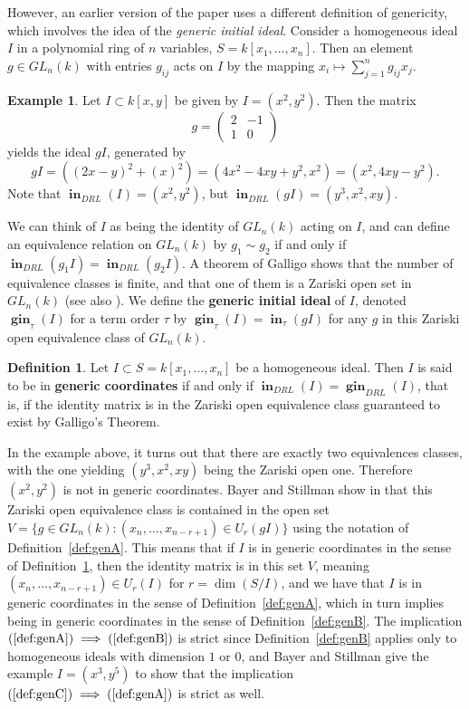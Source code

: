 \documentclass[11pt]{article}
\DeclareMathOperator{\Init}{\mathbf{in}}
\DeclareMathOperator{\gin}{\mathbf{gin}}
\theoremstyle{definition}
\newtheorem{definition}{Definition}
\newtheorem{example}{Example}
\begin{document}
However, an earlier version of the \cite{caminata2020solving} paper uses a different definition of genericity, which involves the idea of the \emph{generic initial ideal}. Consider a homogeneous ideal $I$ in a polynomial ring of $n$ variables, $S = k[x_1, \dots, x_n]$. Then an element $g \in GL_n(k)$ with entries $g_{ij}$ acts on $I$ by the mapping $x_i \mapsto \sum_{j = 1}^n g_{ij} x_j$. 

\begin{example}
	Let $I \subset k[x,y]$ be given by $I = (x^2, y^2)$. Then the matrix \[ g = \begin{pmatrix}
	2 & -1 \\
	1 & 0
\end{pmatrix} \] yields the ideal $gI$, generated by \[ gI = \left((2x - y)^2 + (x)^2\right) = (4x^2 - 4xy + y^2, x^2) = (x^2, 4xy - y^2). \] Note that $\Init_{DRL}(I) = (x^2, y^2)$, but $\Init_{DRL}(gI) = (y^3, x^2, xy)$. 
\end{example}

We can think of $I$ as being the identity of $GL_n(k)$ acting on $I$, and can define an equivalence relation on $GL_n(k)$ by $g_1 \sim g_2$ if and only if $\Init_{DRL}(g_1 I) = \Init_{DRL}(g_2 I)$. A theorem of Galligo \cite{galligo1974propos} shows that the number of equivalence classes is finite, and that one of them is a Zariski open set in $GL_n(k)$ (see also \cite{miller2005combinatorial}). We define the \textbf{generic initial ideal} of $I$, denoted $\gin_{\tau}(I)$ for a term order $\tau$ by $\gin_\tau(I) = \Init_\tau(gI)$ for any $g$ in this Zariski open equivalence class of $GL_n(k)$. 


\begin{definition}\label{def:genC}
	Let $I \subset S = k[x_1, \dots, x_n]$ be a homogeneous ideal. Then $I$ is said to be in \textbf{generic coordinates} if and only if $\Init_{DRL}(I) = \gin_{DRL}(I)$, that is, if the identity matrix is in the Zariski open equivalence class guaranteed to exist by Galligo's Theorem. 
\end{definition} 


In the example above, it turns out that there are exactly two equivalences classes, with the one yielding $(y^3, x^2, xy)$ being the Zariski open one. Therefore $(x^2,y^2)$ is not in generic coordinates. Bayer and Stillman show in \cite{bayer1987criterion} that this Zariski open equivalence class is contained in the open set $V = \{g \in GL_n(k) : (x_n, \dots, x_{n - r + 1}) \in U_r(gI)\}$ using the notation of Definition~\ref{def:genA}. This means that if $I$ is in generic coordinates in the sense of Definition~\ref{def:genC}, then the identity matrix is in this set $V$, meaning $(x_n, \dots, x_{n - r + 1}) \in U_r(I)$ for $r = \dim(S/I)$, and we have that $I$ is in generic coordinates in the sense of Definition~\ref{def:genA}, which in turn implies being in generic coordinates in the sense of Definition~\ref{def:genB}. The implication $(\ref{def:genA}) \implies (\ref{def:genB})$ is strict since Definition~\ref{def:genB} applies only to homogeneous ideals with dimension $1$ or $0$, and Bayer and Stillman give the example $I = (x^3, y^5)$ to show that the implication $(\ref{def:genC}) \implies (\ref{def:genA})$ is strict as well. 
\end{document}
